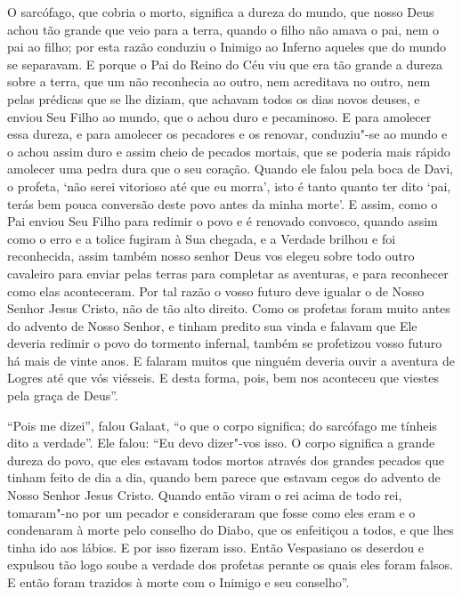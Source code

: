 O sarcófago, que cobria o morto, significa a dureza do mundo, que nosso Deus
achou tão grande que veio para a terra, quando o filho não amava o pai, nem o
pai ao filho; por esta razão conduziu o Inimigo ao Inferno aqueles que do mundo
se separavam. E porque o Pai do Reino do Céu viu que era tão grande a dureza
sobre a terra, que um não reconhecia ao outro, nem acreditava no outro, nem
pelas prédicas que se lhe diziam, que achavam todos os dias novos deuses, e
enviou Seu Filho ao mundo, que o achou duro e pecaminoso. E para amolecer essa
dureza, e para amolecer os pecadores e os renovar, conduziu"-se ao mundo e o
achou assim duro e assim cheio de pecados mortais, que se poderia mais rápido
amolecer uma pedra dura que o seu coração. Quando ele falou pela boca de Davi,
o profeta, ‘não serei vitorioso até que eu morra’, isto é tanto quanto ter dito
‘pai, terás bem pouca conversão deste povo antes da minha morte’. E assim, como
o Pai enviou Seu Filho para redimir o povo e é renovado convosco, quando assim
como o erro e a tolice fugiram à Sua chegada, e a Verdade brilhou e foi
reconhecida, assim também nosso senhor Deus vos elegeu sobre todo outro
cavaleiro para enviar pelas terras para completar as aventuras, e para
reconhecer como elas aconteceram. Por tal razão o vosso futuro deve igualar o
de Nosso Senhor Jesus Cristo, não de tão alto direito. Como os profetas foram
muito antes do advento de Nosso Senhor, e tinham predito sua vinda e falavam
que Ele deveria redimir o povo do tormento infernal, também se profetizou vosso
futuro há mais de vinte anos. E falaram muitos que ninguém deveria ouvir a
aventura de Logres até que vós viésseis. E desta forma, pois, bem nos aconteceu
que viestes pela graça de Deus”.  

 “Pois me dizei”, falou Galaat, “o que o corpo significa; do sarcófago me
tínheis dito a verdade”. Ele falou: “Eu devo dizer"-vos isso. O corpo significa
a grande dureza do povo, que eles estavam todos mortos através dos grandes
pecados que tinham feito de dia a dia, quando bem parece que estavam cegos do
advento de Nosso Senhor Jesus Cristo. Quando então viram o rei acima de todo
rei, tomaram"-no por um pecador e consideraram que fosse como eles eram e o
condenaram à morte pelo conselho do Diabo, que os enfeitiçou a todos, e que
lhes tinha ido aos lábios. E por isso fizeram isso. Então Vespasiano os
deserdou e expulsou tão logo soube a verdade dos profetas perante os quais eles
foram falsos. E então foram trazidos à morte com o Inimigo e seu conselho”. 

